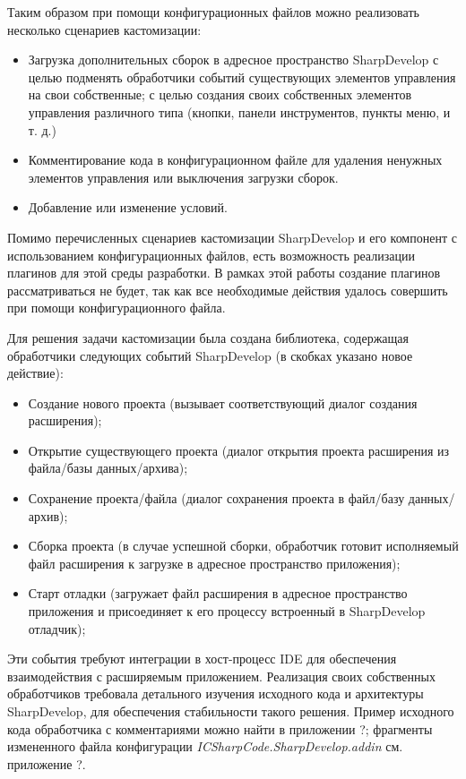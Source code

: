 Таким образом при помощи конфигурационных файлов можно реализовать несколько сценариев кастомизации:

\begin{itemize}
 \item Загрузка дополнительных сборок в адресное пространство SharpDevelop
  \subitem с целью подменять обработчики событий существующих элементов управления на свои собственные;
  \subitem с целью создания своих собственных элементов управления различного типа (кнопки, панели инструментов, пункты меню, и т. д.)
 \item Комментирование кода в конфигурационном файле для удаления ненужных элементов управления или выключения загрузки сборок.
 \item Добавление или изменение условий.
\end{itemize}
 
Помимо перечисленных сценариев кастомизации SharpDevelop и его компонент с использованием конфигурационных файлов, есть возможность реализации плагинов для этой среды разработки. В рамках этой работы создание плагинов рассматриваться не будет, так как все необходимые действия удалось совершить при помощи конфигурационного файла.
 
Для решения задачи кастомизации была создана библиотека, содержащая обработчики следующих событий SharpDevelop (в скобках указано новое действие):

\begin{itemize}
 \item Создание нового проекта (вызывает соответствующий диалог создания расширения);
 \item Открытие существующего проекта (диалог открытия проекта расширения из файла/базы данных/архива);
 \item Сохранение проекта/файла (диалог сохранения проекта в файл/базу данных/архив);
 \item Сборка проекта (в случае успешной сборки, обработчик готовит исполняемый файл расширения к загрузке в адресное пространство приложения);
 \item Старт отладки (загружает файл расширения в адресное пространство приложения и присоединяет к его процессу встроенный в SharpDevelop отладчик);
\end{itemize}

Эти события требуют интеграции в хост-процесс IDE для обеспечения взаимодействия с расширяемым приложением. Реализация своих собственных обработчиков требовала детального изучения исходного кода и архитектуры SharpDevelop, для обеспечения стабильности такого решения. Пример исходного кода обработчика с комментариями можно найти в приложении ?; фрагменты измененного файла конфигурации {\it ICSharpCode.SharpDevelop.addin} см. приложение ?.
 
